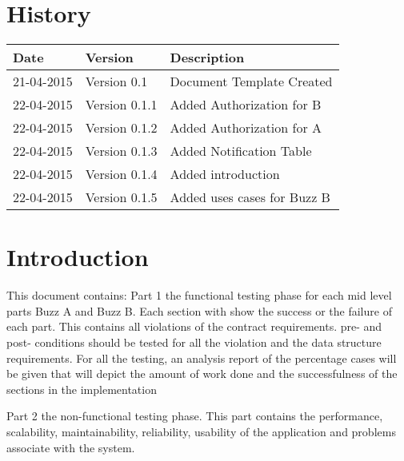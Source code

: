 \documentclass[12pt]{article}
\begin{document}


\section{History}
\begin{tabular}{|p{3cm}|p{5cm}|p{6cm}|}

\hline
Date & Version & Description\\ %
\hline
21-04-2015 & Version 0.1 & Document Template Created\\ %
\hline
22-04-2015 & Version 0.1.1 & Added Authorization for B\\ %
\hline
22-04-2015 & Version 0.1.2 & Added Authorization for A\\ %
\hline
22-04-2015 & Version 0.1.3 & Added Notification Table\\ %
\hline
22-04-2015 & Version 0.1.4 & Added introduction\\ %
\hline
22-04-2015 & Version 0.1.5 & Added uses cases for Buzz B\\ %
\hline


\end{tabular}

\newpage
\tableofcontents
\newpage

\section{Introduction} %
This document contains:
Part 1 the functional testing phase for each mid level parts Buzz A and Buzz B.
Each section with show the success or the failure of each part. This contains all violations of the contract requirements.
pre- and post- conditions should be tested for all the violation and the data structure requirements.
For all the testing, an analysis report of the percentage cases will be given that will depict the amount of work done and the successfulness of the sections in the implementation

Part 2 the non-functional testing phase.
This part contains the performance, scalability, maintainability, reliability, usability of the application and problems associate with the system.
\end{document}
